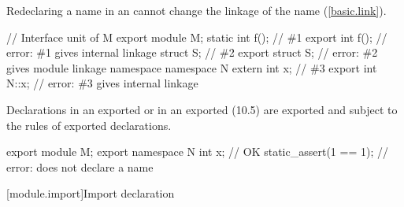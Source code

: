 \begin{std.txt}
  \pnum
  \enternote
  Redeclaring a name in an 
  cannot change the linkage of the name (\ref{basic.link}).
  \begin{example}
  \begin{codeblock}
    // Interface unit of M
    export module M;
    static int f();             // \#1
    export int f();             // error: \#1 gives internal linkage
    struct S;                   // \#2
    export struct S;            // error: \#2 gives module linkage
    namespace {
      namespace N {
        extern int x;           // \#3
      }
    }
    export int N::x;            // error: \#3 gives internal linkage
  \end{codeblock}
  \end{example}
  \exitnote


\pnum
\begin{note}
Declarations in an exported  
or in an exported  (10.5)
are
exported and subject to the rules of exported declarations.
\begin{example}
\begin{codeblock}
export module M;
export namespace N {
  int x;                    // OK
  static_assert(1 == 1);    // error: does not declare a name
}
\end{codeblock}
\end{example}
\end{note}
\end{std.txt}


[module.import]{Import declaration}%

